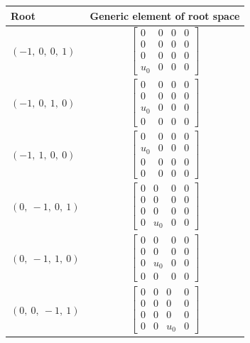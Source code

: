\documentclass[11pt]{article}
\theoremstyle{definition}
\begin{document}
\bigskip

\noindent \begin{longtable}{|l|c|}
    \hline
    \textbf{Root} & \textbf{Generic element of root space} \\
    \hline
    \endhead
    $\left( -1, \  0, \  0, \  1\right)$ & ${\left[\begin{matrix}0 & 0 & 0 & 0\\0 & 0 & 0 & 0\\0 & 0 & 0 & 0\\u_{0} & 0 & 0 & 0\end{matrix}\right]}$ \\
    \hline
    $\left( -1, \  0, \  1, \  0\right)$ & ${\left[\begin{matrix}0 & 0 & 0 & 0\\0 & 0 & 0 & 0\\u_{0} & 0 & 0 & 0\\0 & 0 & 0 & 0\end{matrix}\right]}$ \\
    \hline
    $\left( -1, \  1, \  0, \  0\right)$ & ${\left[\begin{matrix}0 & 0 & 0 & 0\\u_{0} & 0 & 0 & 0\\0 & 0 & 0 & 0\\0 & 0 & 0 & 0\end{matrix}\right]}$ \\
    \hline
    $\left( 0, \  -1, \  0, \  1\right)$ & ${\left[\begin{matrix}0 & 0 & 0 & 0\\0 & 0 & 0 & 0\\0 & 0 & 0 & 0\\0 & u_{0} & 0 & 0\end{matrix}\right]}$ \\
    \hline
    $\left( 0, \  -1, \  1, \  0\right)$ & ${\left[\begin{matrix}0 & 0 & 0 & 0\\0 & 0 & 0 & 0\\0 & u_{0} & 0 & 0\\0 & 0 & 0 & 0\end{matrix}\right]}$ \\
    \hline
    $\left( 0, \  0, \  -1, \  1\right)$ & ${\left[\begin{matrix}0 & 0 & 0 & 0\\0 & 0 & 0 & 0\\0 & 0 & 0 & 0\\0 & 0 & u_{0} & 0\end{matrix}\right]}$ \\

\end{longtable}
\end{document}
